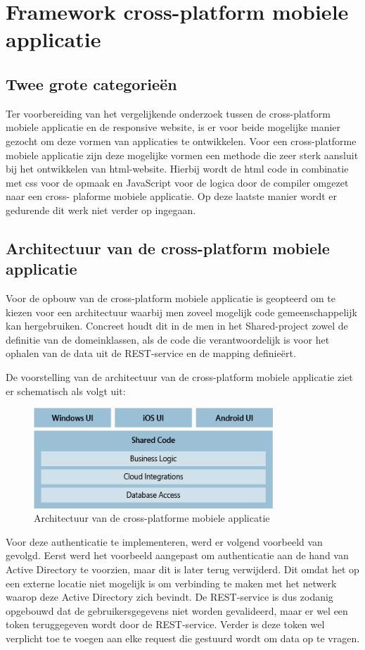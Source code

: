 \chapter{Framework cross-platform mobiele applicatie}
\label{ch:frameworkcrossplatformapp}
\section{Twee grote categorieën}
Ter voorbereiding van het vergelijkende onderzoek tussen de cross-platform mobiele applicatie en de
responsive website, is er voor beide mogelijke manier gezocht om deze vormen van applicaties te ontwikkelen. Voor een cross-platforme
mobiele applicatie zijn deze mogelijke vormen een methode die zeer sterk aansluit bij het ontwikkelen van html-website.
Hierbij wordt de html code in combinatie met css voor de opmaak en JavaScript voor de logica door de compiler omgezet naar een cross-
plaforme mobiele applicatie. Op deze laatste manier wordt er gedurende dit werk niet verder op ingegaan.

\label{sec:architectuurvandecrossplatformemobieleapplicatie}
\section{Architectuur van de cross-platform mobiele applicatie}
Voor de opbouw van de cross-platform mobiele applicatie is geopteerd om te kiezen voor een architectuur waarbij men zoveel mogelijk
code gemeenschappelijk kan hergebruiken. Concreet houdt dit in de men in het Shared-project zowel de definitie van de domeinklassen,
als de code die verantwoordelijk is voor het ophalen van de data uit de REST-service en de mapping definieërt.

De voorstelling van de architectuur van de cross-platform mobiele applicatie ziet er schematisch als volgt uit:
\begin{figure}[ht!]
\centering
\caption{Architectuur van de cross-platforme mobiele applicatie \cite{joshholmes2017}}
\includegraphics[width=90mm]{./img/architecture.png}
\end{figure}

Voor deze authenticatie te implementeren, werd er volgend voorbeeld van \cite{authenticatemvcapplication2017} gevolgd.
Eerst werd het voorbeeld aangepast om authenticatie aan de hand van Active Directory te voorzien, maar dit is later terug verwijderd.
Dit omdat het op een externe locatie niet mogelijk is om verbinding te maken met het netwerk waarop deze Active Directory zich bevindt.
De REST-service is dus zodanig opgebouwd dat de gebruikersgegevens niet worden gevalideerd, maar er wel een token teruggegeven wordt door de REST-service.
Verder is deze token wel verplicht toe te voegen aan elke request die gestuurd wordt om data op te vragen.

